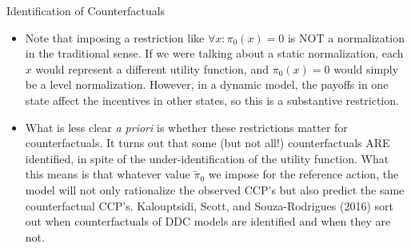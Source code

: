\documentclass[xcolor=pdftex,dvipsnames,table,mathserif,aspectratio=169]{beamer}
\begin{document}

\begin{frame}{Identification of Counterfactuals}
\begin{itemize}
\item Note that imposing a restriction like $\forall x:\pi_{0}\left(x\right)=0$
is NOT a normalization in the traditional sense. If we were talking
about a static normalization, each $x$ would represent a different
utility function, and $\pi_{0}\left(x\right)=0$ would simply be a
level normalization. However, in a dynamic model, the payoffs in one
state affect the incentives in other states, so this is a substantive
restriction.

\medskip
\item What is less clear \emph{a priori} is whether these restrictions matter for counterfactuals.
It turns out that some (but not all!) counterfactuals ARE identified, in spite of the
under-identification of the utility function. What this means is that whatever value
$\widetilde{\pi}_{0}$ we impose for the reference action, the model will not only
rationalize the observed CCP's but also predict the same counterfactual CCP's.
Kalouptsidi, Scott, and Souza-Rodrigues (2016) sort out when counterfactuals
of DDC models are identified and when they are not.
\end{itemize}
\end{frame}
\end{document}
